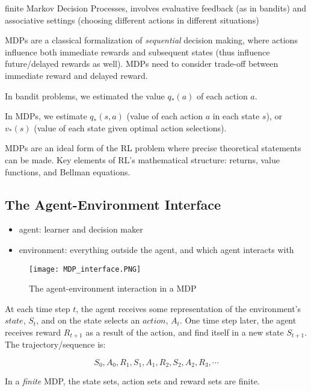 \documentclass[lang=en,mode=geye,device=normal,color=blue,14pt]{elegantnote}
\DeclareMathOperator*{\1}{\mathbbm{1}}
\begin{document}
\begin{definition}
finite Markov Decision Processes, involves evaluative feedback (as in bandits) and associative settings (choosing different actions in different situations)
\end{definition}

MDPs are a classical formalization of \textit{sequential} decision making, where actions influence both immediate rewards and subsequent states (thus influence future/delayed rewards as well). MDPs need to consider trade-off between immediate reward and delayed reward.

In bandit problems, we estimated the value $q_{*}(a)$ of each action $a$.

In MDPs, we estimate $q_{*}(s,a)$ (value of each action $a$ in each state $s$), or $v_{*}(s)$ (value of each state given optimal action selections).

MDPs are an ideal form of the RL problem where precise theoretical statements can be made.
Key elements of RL's mathematical structure: returns, value functions, and Bellman equations.

\subsection{The Agent-Environment Interface}

\begin{itemize}
\item agent: learner and decision maker
\item environment: everything outside the agent, and which agent interacts with
\end{itemize}

\begin{figure}[!h]
  \texttt{[image: MDP\_interface.PNG]}
  \caption{The agent-environment interaction in a MDP}
  \label{fig:MDP_interface}
\end{figure}

At each time step $t$, the agent receives some representation of the environment's $state$, $S_t$, and on the state selects an $action$, $A_t$. One time step later, the agent receives reward $R_{t+1}$ as a result of the action, and find itself in a new state $S_{t+1}$. The trajectory/sequence is:

$$ S_0, A_0, R_1, S_1, A_1, R_2, S_2, A_2, R_3, \cdots $$

In a \textit{finite} MDP, the state sets, action sets and reward sets are finite.
\end{document}
